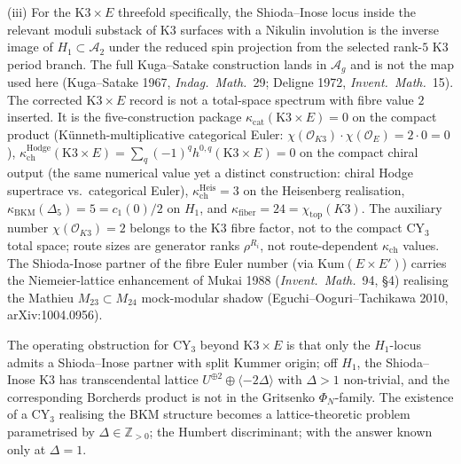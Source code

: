 \begin{remark}
\textup{(iii)} For the $\mathrm{K3} \times E$ threefold specifically,
the Shioda--Inose locus inside the relevant moduli substack of K3
surfaces with a Nikulin involution is the inverse image of
\(H_1\subset \mathcal A_2\) under the reduced spin projection from the
selected rank-\(5\) K3 period branch. The full Kuga--Satake construction
lands in \(\mathcal A_g\) and is not the map used here
\textup{(}Kuga--Satake 1967, \emph{Indag.\ Math.}~29; Deligne 1972,
\emph{Invent.\ Math.}~15\textup{)}.
The corrected $\mathrm{K3} \times E$ record is not a total-space
spectrum with fibre value $2$ inserted. It is the five-construction package
$\kappa_{\mathrm{cat}}(\mathrm{K3} \times E)=0$ on the compact product
\textup{(}K\"unneth-multiplicative categorical Euler:
$\chi(\mathcal O_{K3}) \cdot \chi(\mathcal O_E)=2\cdot 0=0$\textup{)},
$\kappa_{\mathrm{ch}}^{\mathrm{Hodge}}(\mathrm{K3} \times E) =
\sum_q (-1)^q h^{0,q}(\mathrm{K3} \times E) = 0$ on the compact
chiral output \textup{(}the same numerical value yet a distinct
construction: chiral Hodge supertrace vs.\ categorical Euler\textup{)},
$\kappa_{\mathrm{ch}}^{\mathrm{Heis}}=3$ on the Heisenberg realisation,
$\kappa_{\mathrm{BKM}}(\Delta_5)=5=c_1(0)/2$ on $H_1$, and
$\kappa_{\mathrm{fiber}}=24=\chi_{\mathrm{top}}(K3)$. The auxiliary
number $\chi(\mathcal O_{K3})=2$ belongs to the K3 fibre factor, not to
the compact CY$_3$ total space; route sizes are generator ranks
$\rho^{R_i}$, not route-dependent $\kappa_{\mathrm{ch}}$ values. The
Shioda-Inose partner of the fibre Euler number
(via $\mathrm{Kum}(E \times E')$) carries the Niemeier-lattice
enhancement of Mukai 1988 (\emph{Invent.\ Math.}~94, \S 4) realising
the Mathieu $M_{23} \subset M_{24}$ mock-modular shadow
(Eguchi--Ooguri--Tachikawa 2010, arXiv:1004.0956).

The operating obstruction for CY$_3$ beyond $\mathrm{K3} \times E$
is that only the $H_1$-locus admits a Shioda--Inose partner with
split Kummer origin; off $H_1$, the Shioda--Inose K3 has
transcendental lattice $U^{\oplus 2} \oplus \langle -2 \Delta \rangle$
with $\Delta > 1$ non-trivial, and the corresponding Borcherds
product is not in the Gritsenko $\Phi_N$-family. The existence of a
CY$_3$ realising the BKM structure becomes a lattice-theoretic
problem parametrised by $\Delta \in \mathbb Z_{>0}$; the Humbert
discriminant; with the answer known only at $\Delta = 1$.
\end{remark}

